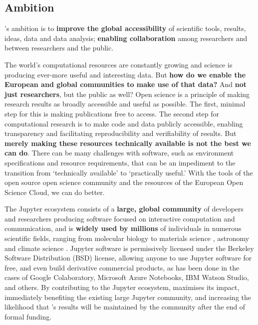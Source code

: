 
\subsection{Ambition}



\TheProject's ambition is to \textbf{improve the global accessibility} of scientific
tools, results, ideas, data and data analysis;
\textbf{enabling collaboration} among researchers and between researchers and the public.

The world's computational resources are
constantly growing and science is producing ever-more useful and
interesting data.  But \textbf{how do we enable the European and global
communities to make use of that data?}  And \textbf{not just researchers}, but
the public as well?  Open science is a principle of making research
results as broadly accessible and useful as possible.  The first,
minimal step for this is making publications free to access.  The
second step for computational research is to make code and data
publicly accessible, enabling transparency and facilitating
reproducibility and verifiability of results.  But \textbf{merely making these
resources technically available is not the best we can do}.  There can
be many challenges with software, such as environment specifications
and resource requirements, that can be an impediment to the transition
from `technically available' to `practically useful.'  With the tools
of the open source open science community and the resources of the
European Open Science Cloud, we can do better.

The Jupyter ecosystem consists of a \textbf{large, global community} of
developers and researchers producing software focused on interactive
computation and communication, and is \textbf{widely used by millions} of
individuals in numerous scientific fields, ranging from molecular
biology \cite{Wang2016} to materials science \cite{Hughes2014},
astronomy \cite{Baron2017} and climate science
\cite{Laken2015,Laken2015b}.  Jupyter software is permissively
licensed under the Berkeley Software Distribution (BSD) license,
allowing anyone to use Jupyter software for free, and even build
derivative commercial products, as has been done in the cases of
Google Colaboratory, Microsoft Azure Notebooks, IBM Watson Studio, and
others.  By contributing to the Jupyter ecosystem,
\TheProject maximises its impact, immediately benefiting the existing
large Jupyter community, and increasing the likelihood that
\TheProject's results will be maintained by the community after the
end of formal funding.

